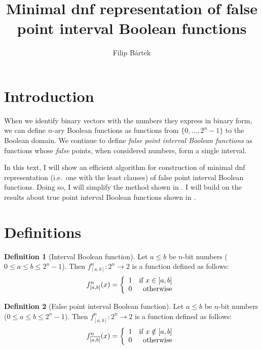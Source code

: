 \documentclass{article}
\author{Filip Bártek}
\title{Minimal \acrshort{dnf} representation of false point interval Boolean functions}
\theoremstyle{plain}
\theoremstyle{definition}
\newtheorem{definition}{Definition}[section]
\newcommand{\interval}[2]{[#1, #2]}
\newcommand{\finterval}[2]{\overline{\interval{#1}{#2}}}
\begin{document}
\maketitle

\section{Introduction}
When we identify binary vectors with the numbers they express in binary form,
we can define $n$-ary Boolean functions
as functions from $\{0, \ldots, 2^n - 1\}$ to the Boolean domain.
We continue to define \emph{false point interval Boolean functions}
as functions whose \emph{false} points,
when considered numbers,
form a single interval.

In this text,
I will show an efficient algorithm
for construction of minimal \acrshort{dnf} representation
(i.e.~one with the least clauses)
of false point interval Boolean functions.
Doing so, I will simplify the method shown in \cite{Dubovsky2012}.
I will build on the results about true point interval Boolean functions
shown in \cite{Schieber2005154}.

\section{Definitions}
\begin{definition}[Interval Boolean function]
Let $a \leq b$ be $n$-bit numbers ($0 \leq a \leq b \leq 2^n - 1$).
Then $f^n_{\interval{a}{b}}: 2^n \rightarrow 2$ is a function defined as follows:
\[f^n_{\interval{a}{b}} (x) = \left\{
  \begin{array}{lr}
    1 & $if $ x \in \interval{a}{b}\\
    0 & $otherwise$
  \end{array}
\right.
\]
\end{definition}

\begin{definition}[False point interval Boolean function]
Let $a \leq b$ be $n$-bit numbers ($0 \leq a \leq b \leq 2^n - 1$).
Then $f^n_{\finterval{a}{b}}: 2^n \rightarrow 2$ is a function defined as follows:
\[f^n_{\finterval{a}{b}} (x) = \left\{
  \begin{array}{lr}
    1 & $if $ x \notin \interval{a}{b}\\
    0 & $otherwise$
  \end{array}
\right.
\]
\end{definition}
\end{document}
